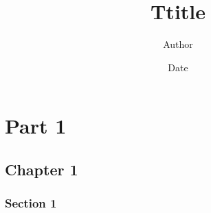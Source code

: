 \documentclass[11pt, letterpaper]{article}
\author{Author}
\title{Ttitle}
\date{Date}
\begin{document}
\maketitle
\newpage
\part{Part 1}
\chapter{Chapter 1}
\section{Section 1}
\end{document}
